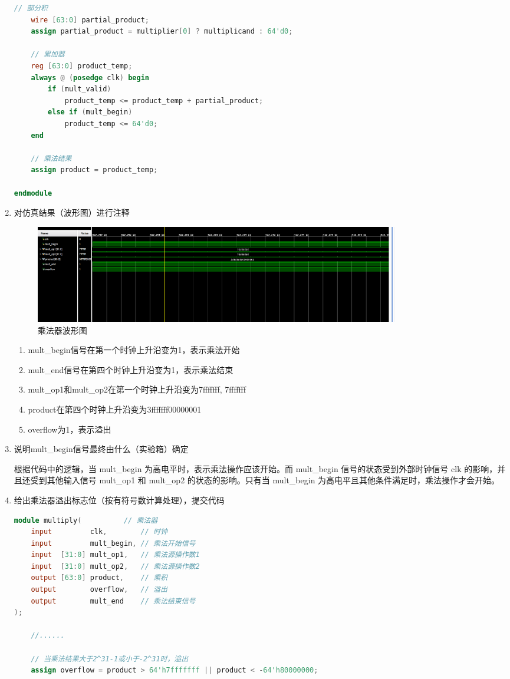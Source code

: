 \documentclass[AutoFakeBold]{LZUThesis}
\begin{document}
\begin{enumerate}
\begin{lstlisting}[language=Verilog]
    // 部分积
    wire [63:0] partial_product;
    assign partial_product = multiplier[0] ? multiplicand : 64'd0;
    
    // 累加器
    reg [63:0] product_temp;
    always @ (posedge clk) begin
        if (mult_valid)
            product_temp <= product_temp + partial_product;
        else if (mult_begin)
            product_temp <= 64'd0;
    end 
    
    // 乘法结果
    assign product = product_temp;

endmodule
    \end{lstlisting}        

    \item 对仿真结果（波形图）进行注释
    \begin{figure}[htbp]
        \centering
        \includegraphics[width=0.8\textwidth]{img/img}
        \caption{乘法器波形图}
    \end{figure}
    \begin{enumerate}
        \item mult\_begin信号在第一个时钟上升沿变为1，表示乘法开始
        \item mult\_end信号在第四个时钟上升沿变为1，表示乘法结束
        \item mult\_op1和mult\_op2在第一个时钟上升沿变为7fffffff, 7fffffff
        \item product在第四个时钟上升沿变为3fffffff00000001
        \item overflow为1，表示溢出
    \end{enumerate}
    \item 说明mult\_begin信号最终由什么（实验箱）确定

    根据代码中的逻辑，当 mult\_begin 为高电平时，表示乘法操作应该开始。而 mult\_begin 信号的状态受到外部时钟信号 clk 的影响，并且还受到其他输入信号 mult\_op1 和 mult\_op2 的状态的影响。只有当 mult\_begin 为高电平且其他条件满足时，乘法操作才会开始。
    \item 给出乘法器溢出标志位（按有符号数计算处理），提交代码
    \begin{lstlisting}[language=Verilog]
    module multiply(          // 乘法器
    input         clk,        // 时钟
    input         mult_begin, // 乘法开始信号
    input  [31:0] mult_op1,   // 乘法源操作数1
    input  [31:0] mult_op2,   // 乘法源操作数2
    output [63:0] product,    // 乘积
    output        overflow,   // 溢出
    output        mult_end    // 乘法结束信号
);

    //......

    // 当乘法结果大于2^31-1或小于-2^31时，溢出
    assign overflow = product > 64'h7fffffff || product < -64'h80000000;
    \end{lstlisting}
\end{enumerate}
\backmatter
\end{document}
